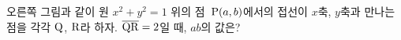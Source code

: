 \noindent\begin{minipage}[t]{0.58\linewidth}\vspace{0pt}\raggedright 오른쪽 그림과 같이 원 $x^2+y^2=1$ 위의 점~$\mathrm{P}(a{,}\mkern3mu\mathopen{}b)$에서의 접선이 $x$축, $y$축과 만나는 점을 각각 $\mathrm{Q}$, $\mathrm{R}$라 하자. $\overline{\mathrm{QR}}=2$일 때, $ab$의 값은? \end{minipage}\hfill\begin{minipage}[t]{0.4\linewidth}\vspace{0pt}\centering \resizebox{\ifdim\width>\linewidth\linewidth\else\width\fi}{!}{}\end{minipage}\par
{}

